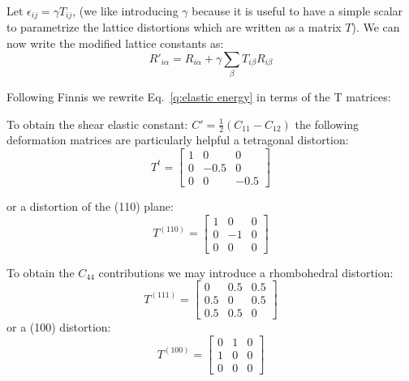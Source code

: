 Let $\epsilon_{ij} = \gamma T_{ij}$, (we like introducing $\gamma$ because it is useful to have a simple scalar
to parametrize the lattice distortions which are written as a matrix $T$).
We can now write the modified lattice constants as:
%
\begin{equation}
R'_{i\alpha} =  R_{i\alpha} + \gamma \sum_{\beta} T_{i\beta}R_{i\beta}
\end{equation}
%

Following Finnis we rewrite Eq.~\ref{q:elastic energy} in terms of the T matrices:

To obtain the shear elastic constant: $C' = \frac{1}{2}(C_{11}-C_{12})$ the following deformation
matrices are particularly helpful a tetragonal distortion:
%
\begin{equation}
T^{t} =  
    \begin{bmatrix}
         1 &   0   & 0  \\
         0 &  -0.5 & 0  \\    
         0 &   0   &-0.5 
    \end{bmatrix}
\end{equation}

or a distortion of the (110) plane:
%
\begin{equation}
T^{(110)} = 
    \begin{bmatrix}
            1 &  0 & 0  \\
            0 & -1 & 0  \\    
            0 &  0 & 0 
    \end{bmatrix}
\end{equation}

To obtain the $C_{44}$ contributions we may introduce
a rhombohedral distortion:
%
\begin{equation}
T^{(111)} =  
    \begin{bmatrix}
             0   & 0.5 & 0.5 \\
             0.5 & 0   & 0.5 \\    
             0.5 & 0.5 & 0 
    \end{bmatrix}
\end{equation}
%
or a (100) distortion:
%
\begin{equation}
T^{(100)} =  
\begin{bmatrix}
             0 & 1 & 0 \\
             1 & 0 & 0 \\    
             0 & 0 & 0 
\end{bmatrix}
\end{equation}
%

